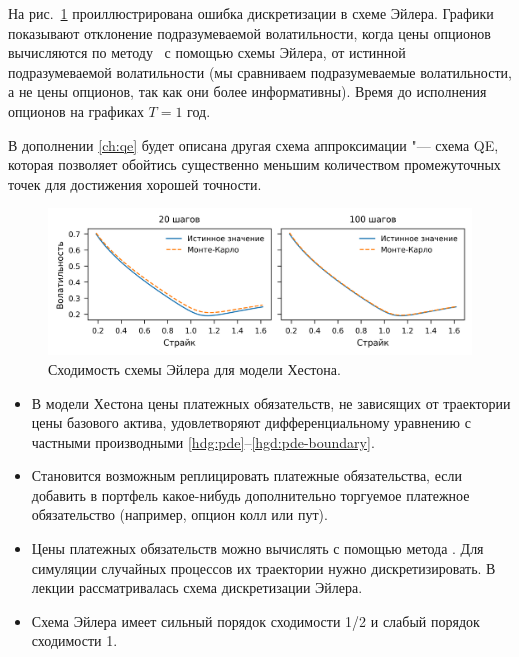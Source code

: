На рис.~\ref{hdg:f:euler} проиллюстрирована ошибка дискретизации в схеме Эйлера. 
Графики показывают отклонение подразумеваемой волатильности, когда цены опционов вычисляются по методу \mc\ с помощью схемы Эйлера, от истинной подразумеваемой волатильности (мы сравниваем подразумеваемые волатильности, а не цены опционов, так как они более информативны).
Время до исполнения опционов на графиках $T=1$ год.

В дополнении \ref{ch:qe} будет описана другая схема аппроксимации "--- схема QE, которая позволяет обойтись существенно меньшим количеством промежуточных точек для достижения хорошей точности.

\begin{figure}[th]
\centering
\includegraphics{pic/heston-euler.png}
\caption{Сходимость схемы Эйлера для модели Хестона.}
\label{hdg:f:euler}
\end{figure}


\summary
\begin{itemize}
\item В модели Хестона цены платежных обязательств, не зависящих от траектории цены базового актива, удовлетворяют дифференциальному уравнению с частными производными \eqref{hdg:pde}--\eqref{hgd:pde-boundary}.

\item Становится возможным реплицировать платежные обязательства, если добавить в портфель какое-нибудь дополнительно торгуемое платежное обязательство (например, опцион колл или пут).

\item Цены платежных обязательств можно вычислять с помощью метода \mc.
Для симуляции случайных процессов их траектории нужно дискретизировать.
В лекции рассматривалась схема дискретизации Эйлера.

\item Схема Эйлера имеет сильный порядок сходимости 1/2 и слабый порядок сходимости 1.
\end{itemize}
